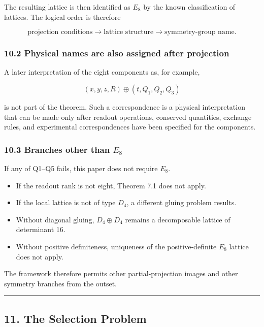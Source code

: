 \documentclass[
  a4paper,
]{article}
\providecommand{\tightlist}{%
  \setlength{\itemsep}{0pt}\setlength{\parskip}{0pt}}
\begin{document}
The resulting lattice is then identified as \(E_8\) by the known
classification of lattices. The logical order is therefore

\[
\boxed{
\text{projection conditions}
\longrightarrow
\text{lattice structure}
\longrightarrow
\text{symmetry-group name}.
}
\]

\subsubsection{10.2 Physical names are also assigned after
projection}\label{physical-names-are-also-assigned-after-projection}

A later interpretation of the eight components as, for example,

\[
(x,y,z,R)
\oplus
(t,Q_1,Q_2,Q_3)
\]

is not part of the theorem. Such a correspondence is a physical
interpretation that can be made only after readout operations, conserved
quantities, exchange rules, and experimental correspondences have been
specified for the components.

\subsubsection{\texorpdfstring{10.3 Branches other than
\(E_8\)}{10.3 Branches other than E\_8}}\label{branches-other-than-e_8}

If any of Q1--Q5 fails, this paper does not require \(E_8\).

\begin{itemize}
\tightlist
\item
  If the readout rank is not eight, Theorem 7.1 does not apply.
\item
  If the local lattice is not of type \(D_4\), a different gluing
  problem results.
\item
  Without diagonal gluing, \(D_4\oplus D_4\) remains a decomposable
  lattice of determinant 16.
\item
  Without positive definiteness, uniqueness of the positive-definite
  \(E_8\) lattice does not apply.
\end{itemize}

The framework therefore permits other partial-projection images and
other symmetry branches from the outset.

\begin{center}\rule{0.5\linewidth}{0.5pt}\end{center}

\subsection{11. The Selection Problem}\label{the-selection-problem}
\end{document}
